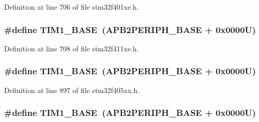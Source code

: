 Definition at line 706 of file stm32f401xe.\+h.

\subsubsection[{\texorpdfstring{T\+I\+M1\+\_\+\+B\+A\+SE}{TIM1_BASE}}]{\setlength{\rightskip}{0pt plus 5cm}\#define T\+I\+M1\+\_\+\+B\+A\+SE~({\bf A\+P\+B2\+P\+E\+R\+I\+P\+H\+\_\+\+B\+A\+SE} + 0x0000\+U)}\hypertarget{group___peripheral__registers__structures_gaf8aa324ca5011b8173ab16585ed7324a}{}\label{group___peripheral__registers__structures_gaf8aa324ca5011b8173ab16585ed7324a}


Definition at line 708 of file stm32f411xe.\+h.

\subsubsection[{\texorpdfstring{T\+I\+M1\+\_\+\+B\+A\+SE}{TIM1_BASE}}]{\setlength{\rightskip}{0pt plus 5cm}\#define T\+I\+M1\+\_\+\+B\+A\+SE~({\bf A\+P\+B2\+P\+E\+R\+I\+P\+H\+\_\+\+B\+A\+SE} + 0x0000\+U)}\hypertarget{group___peripheral__registers__structures_gaf8aa324ca5011b8173ab16585ed7324a}{}\label{group___peripheral__registers__structures_gaf8aa324ca5011b8173ab16585ed7324a}


Definition at line 897 of file stm32f405xx.\+h.

\subsubsection[{\texorpdfstring{T\+I\+M1\+\_\+\+B\+A\+SE}{TIM1_BASE}}]{\setlength{\rightskip}{0pt plus 5cm}\#define T\+I\+M1\+\_\+\+B\+A\+SE~({\bf A\+P\+B2\+P\+E\+R\+I\+P\+H\+\_\+\+B\+A\+SE} + 0x0000\+U)}\hypertarget{group___peripheral__registers__structures_gaf8aa324ca5011b8173ab16585ed7324a}{}\label{group___peripheral__registers__structures_gaf8aa324ca5011b8173ab16585ed7324a}


